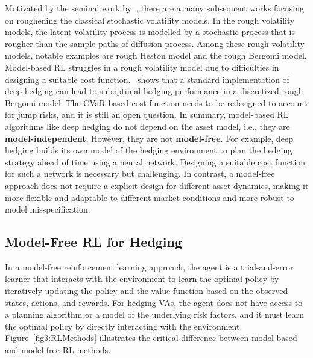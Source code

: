 Motivated by the seminal work by~\cite{gatheral2022volatility}, there are a many subsequent works focusing on roughening the classical stochastic volatility models. 
In the rough volatility models, the latent volatility process is modelled by a stochastic process that is rougher than the sample paths of diffusion process. 
Among these rough volatility models, notable examples are rough Heston model and the rough Bergomi model. 
Model-based RL struggles in a rough volatility model due to difficulties in designing a suitable cost function.~\cite{horvath2021deep} shows that a standard implementation of deep hedging can lead to suboptimal hedging performance in a discretized rough Bergomi model. 
The CVaR-based cost function needs to be redesigned to account for jump risks, and it is still an open question.
In summary, model-based RL algorithms like deep hedging do not depend on the asset model, i.e., they are \textbf{model-independent}.
However, they are not \textbf{model-free}.
For example, deep hedging builds its own model of the hedging environment to plan the hedging strategy ahead of time using a neural network.
Designing a suitable cost function for such a network is necessary but challenging.
In contrast, a model-free approach does not require a explicit design for different asset dynamics, making it more flexible and adaptable to different market conditions and more robust to model misspecification.

\subsection{Model-Free RL for Hedging}
    
In a model-free reinforcement learning approach, the agent is a trial-and-error learner that interacts with the environment to learn the optimal policy by iteratively updating the policy and the value function based on the observed states, actions, and rewards.
For hedging VAs, the agent does not have access to a planning algorithm or a model of the underlying risk factors, and it must learn the optimal policy by directly interacting with the environment.
Figure~\ref{fig3:RLMethods} illustrates the critical difference between model-based and model-free RL methods.

